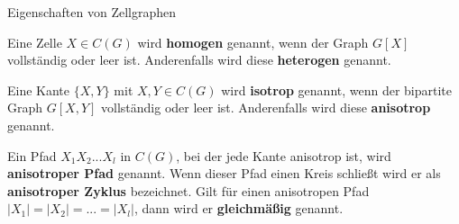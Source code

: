 \documentclass{beamer}
\begin{document}
	\begin{frame}{Eigenschaften von Zellgraphen}
		\begin{Definition}
			Eine Zelle $X\in C(G)$ wird \alert{\textbf{homogen}} genannt, wenn der Graph $G[X]$ vollständig oder leer ist.
			Anderenfalls wird diese \alert{\textbf{heterogen}} genannt.
		\end{Definition}
		\pause
		\begin{Definition}
			Eine Kante $\{X,Y\}$ mit $X,Y\in C(G)$ wird \alert{\textbf{isotrop}} genannt, wenn der bipartite Graph $G[X,Y]$ vollständig oder leer ist.
			Anderenfalls wird diese \alert{\textbf{anisotrop}} genannt.
		\end{Definition}
		\pause
		\begin{Definition}
			Ein Pfad $X_1X_2...X_l$ in $C(G)$, bei der jede Kante anisotrop ist, wird \alert{\textbf{anisotroper Pfad}} genannt.
			Wenn dieser Pfad einen Kreis schließt wird er als \alert{\textbf{anisotroper Zyklus}} bezeichnet.
			Gilt für einen anisotropen Pfad $|X_1|=|X_2|=...=|X_l|$, dann wird er \alert{\textbf{gleichmäßig}} genannt.
		\end{Definition}
	\end{frame}
\end{document}
